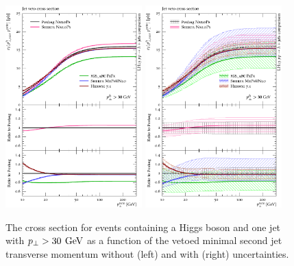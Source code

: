 {\begin{figure}[t!]
  \centering
  \includegraphics[width=0.47\textwidth]{figures/hjetscomp_u_xs_jet_veto_j1_30.pdf}
  \hfill
  \includegraphics[width=0.47\textwidth]{figures/hjetscomp_xs_jet_veto_j1_30.pdf}
  \caption{
    The cross section for events containing a Higgs boson 
    and one jet with $p_\perp>30\,\text{\:GeV}$ as a function of
    the vetoed minimal second jet transverse momentum without
    (left) and with (right) uncertainties.
    \label{fig:hjetscomp:results:jvobs:jvxs1j30}
  }
\end{figure}

}
